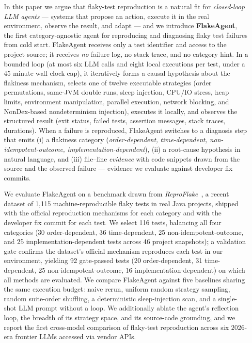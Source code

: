 In this paper we argue that flaky-test reproduction is a natural fit for
\emph{closed-loop LLM agents} — systems that propose an action, execute it in
the real environment, observe the result, and adapt — and we introduce
\textbf{FlakeAgent}, the first category-agnostic agent for reproducing and
diagnosing flaky test failures from cold start. FlakeAgent receives only a
test identifier and access to the project source; it receives
\emph{no} failure log, no stack trace, and no category hint. In a bounded
loop (at most six LLM calls and eight local executions per test, under a
45-minute wall-clock cap), it iteratively forms a causal hypothesis about the
flakiness mechanism, selects one of twelve executable strategies
(order permutations, same-JVM double runs, sleep injection, CPU/IO stress,
heap limits, environment manipulation, parallel execution, network blocking,
and NonDex-based nondeterminism injection), executes it locally, and observes
the structured result (exit status, failed tests, assertion messages, stack
traces, durations). When a failure is reproduced, FlakeAgent switches to a
diagnosis step that emits (i) a flakiness category
(\emph{order-dependent, time-dependent, non-idempotent-outcome,
implementation-dependent}), (ii) a root-cause hypothesis in natural language,
and (iii) file--line \emph{evidence} with code snippets drawn from the source
and the observed failure — evidence we evaluate against developer fix commits.

We evaluate FlakeAgent on a benchmark drawn from
\emph{ReproFlake}~\cite{zhang2026reproflake}, a recent dataset of 1{,}115
machine-reproducible flaky tests in real Java projects, shipped with the
official reproduction mechanisms for each category and with the developer fix
commit for each test. We select 116 tests, balancing all four categories (30
order-dependent, 36 time-dependent, 25 non-idempotent-outcome, and 25
implementation-dependent tests across 46 project snapshots); a validation gate
confirms the dataset's official mechanism reproduces each test in our
environment, yielding 92 gate-passed tests (20 order-dependent, 31
time-dependent, 25 non-idempotent-outcome, 16 implementation-dependent) on
which all methods are evaluated. We compare FlakeAgent against five baselines sharing the
same execution budget: naive rerun, uniform random strategy sampling, random
suite-order shuffling, a deterministic sleep-injection scan, and a single-shot
LLM prompt without a loop. We additionally ablate the agent's reflection loop,
the breadth of its strategy space, and its source-code grounding, and we
report the first cross-model comparison of flaky-test reproduction across six
2026-era frontier LLMs accessed via vendor APIs.

